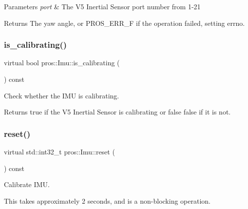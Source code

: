 \begin{DoxyParams}{Parameters}
{\em port} & The V5 Inertial Sensor port number from 1-\/21 \\
\hline
\end{DoxyParams}
\begin{DoxyReturn}{Returns}
The yaw angle, or P\+R\+O\+S\+\_\+\+E\+R\+R\+\_\+F if the operation failed, setting errno. 
\end{DoxyReturn}
\mbox{\label{classpros_1_1Imu_af7426c086f6f810cca98f4e77765189c}} 
\subsubsection{\texorpdfstring{is\+\_\+calibrating()}{is\_calibrating()}}
{\footnotesize\ttfamily virtual bool pros\+::\+Imu\+::is\+\_\+calibrating (\begin{DoxyParamCaption}{ }\end{DoxyParamCaption}) const\hspace{0.3cm}{\ttfamily [virtual]}}



Check whether the I\+MU is calibrating. 

\begin{DoxyReturn}{Returns}
true if the V5 Inertial Sensor is calibrating or false false if it is not. 
\end{DoxyReturn}
\mbox{\label{classpros_1_1Imu_ad7973cfad5f8f83e7007342055197c43}} 
\subsubsection{\texorpdfstring{reset()}{reset()}}
{\footnotesize\ttfamily virtual std\+::int32\+\_\+t pros\+::\+Imu\+::reset (\begin{DoxyParamCaption}{ }\end{DoxyParamCaption}) const\hspace{0.3cm}{\ttfamily [virtual]}}



Calibrate I\+MU. 

This takes approximately 2 seconds, and is a non-\/blocking operation.

